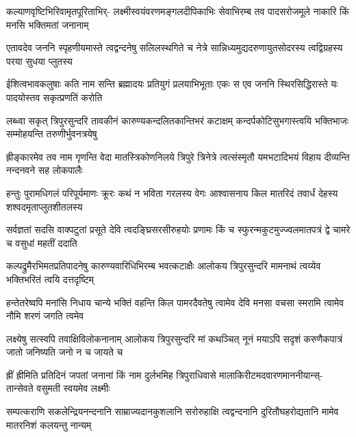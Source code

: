 
\fourlineindentedshloka
{कल्याणवृष्टिभिरिवामृतपूरिताभिर्-}
{लक्ष्मीस्वयंवरणमङ्गलदीपिकाभिः}
{सेवाभिरम्ब तव पादसरोजमूले}
{नाकारि किं मनसि भक्तिमतां जनानाम्}%

\fourlineindentedshloka
{एतावदेव जननि स्पृहणीयमास्ते}
{त्वद्वन्दनेषु सलिलस्थगिते च नेत्रे}
{सान्निध्यमुद्यदरुणायुतसोदरस्य}
{त्वद्विग्रहस्य परया सुधया प्लुतस्य}%

\fourlineindentedshloka
{ईशित्वभावकलुषाः कति नाम सन्ति}
{ब्रह्मादयः प्रतियुगं प्रलयाभिभूताः}
{एकः स एव जननि स्थिरसिद्धिरास्ते}
{यः पादयोस्तव सकृत्प्रणतिं करोति}%

\fourlineindentedshloka
{लब्ध्वा सकृत् त्रिपुरसुन्दरि तावकीनं}
{कारुण्यकन्दलितकान्तिभरं कटाक्षम्}
{कन्दर्पकोटिसुभगास्त्वयि भक्तिभाजः}
{सम्मोहयन्ति तरुणीर्भुवनत्रयेषु}%

\fourlineindentedshloka
{ह्रीङ्कारमेव तव नाम गृणन्ति वेदा}
{मातस्त्रिकोणनिलये त्रिपुरे त्रिनेत्रे}
{त्वत्संस्मृतौ यमभटादिभयं विहाय}
{दीव्यन्ति नन्दनवने सह लोकपालैः}%

\fourlineindentedshloka
{हन्तुः पुरामधिगलं परिपूर्यमाणः}
{क्रूरः कथं न भविता गरलस्य वेगः}
{आश्वासनाय किल मातरिदं तवार्धं}
{देहस्य शश्वदमृताप्लुतशीतलस्य}%

\fourlineindentedshloka
{सर्वज्ञतां सदसि वाक्पटुतां प्रसूते}
{देवि त्वदङ्घ्रिसरसीरुहयोः प्रणामः}
{किं च स्फुरन्मकुटमुज्ज्वलमातपत्रं}
{द्वे चामरे च वसुधां महतीं ददाति}%

\fourlineindentedshloka
{कल्पद्रुमैरभिमतप्रतिपादनेषु}
{कारुण्यवारिधिभिरम्ब भवत्कटाक्षैः}
{आलोकय त्रिपुरसुन्दरि मामनाथं}
{त्वय्येव भक्तिभरितं त्वयि दत्तदृष्टिम्}%

\fourlineindentedshloka
{हन्तेतरेष्वपि मनांसि निधाय चान्ये}
{भक्तिं वहन्ति किल पामरदैवतेषु}
{त्वामेव देवि मनसा वचसा स्मरामि}
{त्वामेव नौमि शरणं जगति त्वमेव}%

\fourlineindentedshloka
{लक्ष्येषु सत्स्वपि तवाक्षिविलोकनानाम्}
{आलोकय त्रिपुरसुन्दरि मां कथञ्चित्}
{नूनं मयाऽपि सदृशं करुणैकपात्रं}
{जातो जनिष्यति जनो न च जायते च}%

\fourlineindentedshloka
{ह्रीं ह्रीमिति प्रतिदिनं जपतां जनानां}
{किं नाम दुर्लभमिह त्रिपुराधिवासे}
{मालाकिरीटमदवारणमाननीयान्स्-}
{तान्सेवते वसुमती स्वयमेव लक्ष्मीः}%

\fourlineindentedshloka
{सम्पत्कराणि सकलेन्द्रियनन्दनानि}
{साम्राज्यदानकुशलानि सरोरुहाक्षि}
{त्वद्वन्दनानि दुरितौघहरोद्यतानि}
{मामेव मातरनिशं कलयन्तु नान्यम्}%

